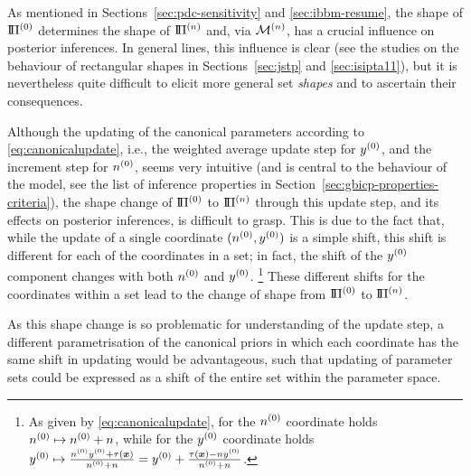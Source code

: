 As mentioned in Sections~\ref{sec:pdc-sensitivity} and \ref{sec:ibbm-resume},
the shape of $\text{I}\!\Pi^{(0)}$ determines the shape of $\text{I}\!\Pi^{(n)}$ and, via $\mathcal{M}^{(n)}$, has a crucial influence on posterior inferences.
In general lines, this influence is clear
(see the studies on the behaviour of rectangular shapes in Sections~\ref{sec:jstp} and \ref{sec:isipta11}),
but it is nevertheless quite difficult to elicit more general set \emph{shapes} and to ascertain their consequences.

Although the updating of the canonical parameters according to \eqref{eq:canonicalupdate},
i.e., the weighted average update step for $y^{(0)}$, and the increment step for $n^{(0)}$,
seems very intuitive (and is central to the behaviour of the model,
see the list of inference properties in Section~\ref{sec:gbicp-properties-criteria}),
the shape change of $\text{I}\!\Pi^{(0)}$ to $\text{I}\!\Pi^{(n)}$ through this update step,
and its effects on posterior inferences, is difficult to grasp.
This is due to the fact that,
while the update of a single coordinate $(n^{(0)},y^{(0)})$ is a simple shift,
this shift is different for each of the coordinates in a set;
in fact, the shift of the $y^{(0)}$ component changes with both $n^{(0)}$ and $y^{(0)}$.%
\footnote{As given by \eqref{eq:canonicalupdate},
for the $n^{(0)}$ coordinate holds $n^{(0)} \mapsto n^{(0)}+n$,
while for the $y^{(0)}$ coordinate holds $y^{(0)} \mapsto \frac{n^{(0)}y^{(0)} + \tau({\bm x})}{n^{(0)}+n} = y^{(0)} + \frac{\tau({\bm x})-ny^{(0)}}{n^{(0)}+n}$.}
These different shifts for the coordinates within a set
lead to the change of shape from $\text{I}\!\Pi^{(0)}$ to $\text{I}\!\Pi^{(n)}$.

As this shape change is so problematic for understanding of the update step,
a different parametrisation of the canonical priors
in which each coordinate has the same shift in updating
would be advantageous,
such that updating of parameter sets
could be expressed as a shift of the entire set within the parameter space.

